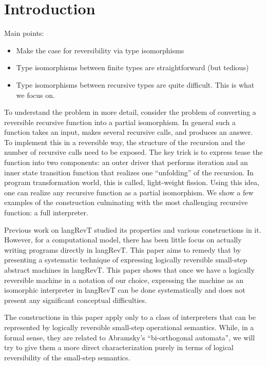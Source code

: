 \documentclass{llncs}
\begin{document}
\section{Introduction} 

Main points: 
\begin{itemize}
\item Make the case for reversibility via type isomorphisms
\item Type isomorphisms between finite types are straightforward (but
  tedious)
\item Type isomorphisms between recursive types are quite difficult. This is
  what we focus on.
\end{itemize}
To understand the problem in more detail, consider the problem of converting
a reversible recursive function into a partial isomorphism. In general such a
function takes an input, makes several recursive calls, and produces an
answer. To implement this in a reversible way, the structure of the recursion
and the number of recursive calls need to be exposed. The key trick is to
express tease the function into two components: an outer driver that performs
iteration and an inner state transition function that realizes one
``unfolding'' of the recursion. In program transformation world, this is
called, light-weight fission. Using this idea, one can realize any recursive
function as a partial isomorphism. We show a few examples of the construction
culminating with the most challenging recursive function: a full interpreter.







Previous work on {{langRevT}} \cite{rc2011,infeffects} studied its
properties and various constructions in it. However, for a
computational model, there has been little focus on actually writing
programs directly in {{langRevT}}. This paper aims to remedy that by
presenting a systematic technique of expressing logically reversible
small-step abstract machines in {{langRevT}}. This paper shows that
once we have a logically reversible machine in a notation of our
choice, expressing the machine as an isomorphic interpreter in
{{langRevT}} can be done systematically and does not present any
significant conceptual difficulties.

The constructions in this paper apply only to a class of interpreters
that can be represented by logically reversible small-step operational
semantics. While, in a formal sense, they are related to Abramsky's
``bi-orthogonal automata''\cite{abramsky2005structural}, we will try
to give them a more direct characterization purely in terms of logical
reversibility of the small-step semantics.
\end{document}
